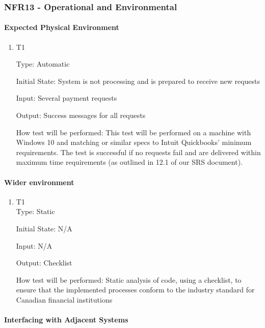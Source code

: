 \documentclass[12pt, titlepage]{article}
\begin{document}
\subsubsection{NFR13 - Operational and Environmental}

\paragraph{Expected Physical Environment}

\begin{enumerate}

\item{T1\\}
  
Type: Automatic

Initial State: System is not processing and is prepared to receive new requests

Input: Several payment requests

Output: Success messages for all requests

How test will be performed: This test will be performed on a machine with Windows 10 and matching or similar specs to Intuit Quickbooks’ minimum requirements. The test is successful if no requests fail and are delivered within maximum time requirements (as outlined in 12.1 of our SRS document).
  
\end{enumerate}

\paragraph{Wider environment}

\begin{enumerate}

\item{T1\\}
Type: Static

Initial State: N/A

Input: N/A

Output: Checklist 

How test will be performed: Static analysis of code, using a checklist, to ensure that the implemented processes conform to the industry standard for Canadian financial institutions
  
\end{enumerate}

\paragraph{Interfacing with Adjacent Systems}
\end{document}
